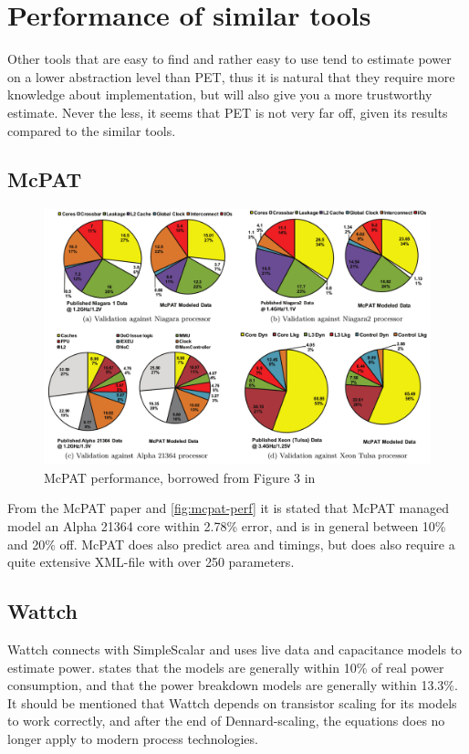 \section{Performance of similar tools}
Other tools that are easy to find and rather easy to use tend to estimate
power on a lower abstraction level than PET, thus it is natural that they
require more knowledge about implementation, but will also give you a more
trustworthy estimate. Never the less, it seems that PET is not very far off,
given its results compared to the similar tools.

\subsection{McPAT}

\begin{figure}[htb]
\includegraphics[width=\textwidth]{figs/mcpat-performance.png}
\caption{McPAT performance, borrowed from Figure 3 in \cite{li2009mcpat}}
\label{fig:mcpat-perf}
\end{figure}

From the McPAT paper \cite{li2009mcpat} and \autoref{fig:mcpat-perf} it is
stated that McPAT managed model an Alpha 21364 core within 2.78\% error, and is
in general between 10\% and 20\% off. McPAT does also predict area and timings,
but does also require a quite extensive XML-file with over 250 parameters.

\subsection{Wattch}

Wattch connects with SimpleScalar and uses live data and capacitance models to
estimate power. \cite{brooks2000wattch} states that the models are generally
within 10\% of real power consumption, and that the power breakdown models are
generally within 13.3\%. It should be mentioned that Wattch depends on
transistor scaling for its models to work correctly, and after the end of
Dennard-scaling, the equations does no longer apply to modern process
technologies.


